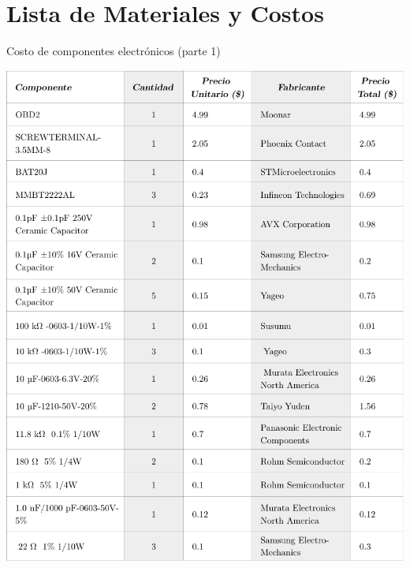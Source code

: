 \chapter{Lista de Materiales y Costos}
\label{anexo:costos}
 \graphicspath{{Appendix3/Figuras/}{Appendix3/Figs/PDF/}{Appendix3/Figs/}}



\begin{table}[htb!]
  \centering
  \caption{Costo de componentes electrónicos (parte 1)}
  \label{diag:costos_elec_1}
  \includegraphics[width=0.8\linewidth]{BOM_1.pdf}
\end{table}

